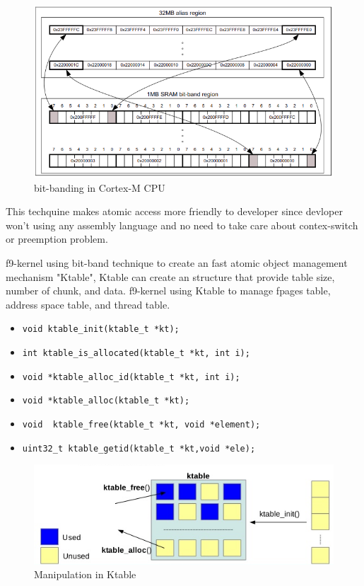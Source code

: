 \documentclass[10pt,preprint,nocopyrightspace]{sigplanconf}
\begin{document}
\begin{figure}[H]
\begin{center}
	\includegraphics[width=\linewidth]{picture/bit-banding.png}
\end{center}
\caption{bit-banding in Cortex-M CPU\cite{st2016manual}}
\end{figure}

This techquine makes atomic access more friendly to developer since devloper won't using any assembly language and no need to take care about contex-switch or preemption problem.

f9-kernel using bit-band technique to create an fast atomic object management mechanism "Ktable", Ktable can create an structure that provide table size, number of chunk, and data. f9-kernel using Ktable to manage fpages table, address space table, and thread table.

\begin{itemize}
\footnotesize
\item \verb|void ktable_init(ktable_t *kt);|
\item \verb|int ktable_is_allocated(ktable_t *kt, int i);|
\item \verb|void *ktable_alloc_id(ktable_t *kt, int i);|
\item \verb|void *ktable_alloc(ktable_t *kt);|
\item \verb|void  ktable_free(ktable_t *kt, void *element);|
\item \verb|uint32_t ktable_getid(ktable_t *kt,void *ele);|
\end{itemize}


\begin{figure}[H]
	\begin{center}
		\includegraphics[width=\linewidth]{picture/ktable.png}
	\end{center}
	\caption{Manipulation in Ktable\cite{ncku2015}}
\end{figure}
\end{document}
